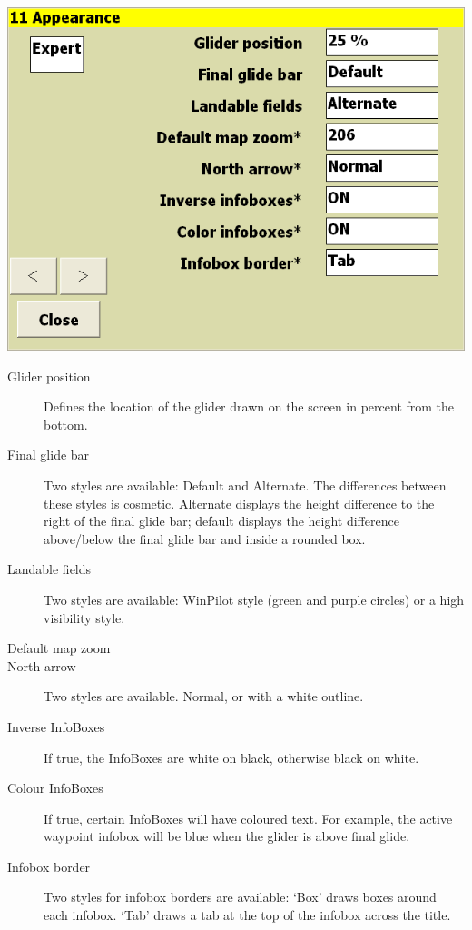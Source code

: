 \documentclass[a4paper,12pt]{refrep}
\begin{document}
\begin{center}
\includegraphics[angle=0,width=\linewidth,keepaspectratio='true']{figures/config-9.png}
\end{center}

\begin{description}
\item[Glider position]  Defines the location of the glider drawn on the screen
in percent from the bottom.
\item[Final glide bar] Two styles are available: Default and Alternate.  The differences between these styles is cosmetic.  Alternate displays the height difference to the right of the final glide bar; default displays the height difference above/below the final glide bar and inside a rounded box.
\item[Landable fields] Two styles are available: WinPilot style (green and
  purple circles) or a high visibility style.
\item[Default map zoom]
\item[North arrow]  Two styles are available.  Normal, or with a white
 outline.
\item[Inverse InfoBoxes]  If true, the InfoBoxes are white on black, otherwise black on white.
\item[Colour InfoBoxes]  If true, certain InfoBoxes will have coloured text.  For example, the active waypoint infobox will be blue when the glider is above final glide.
\item[Infobox border]  Two styles for infobox borders are available:
`Box' draws boxes around each infobox.  `Tab' draws a tab at the top
of the infobox across the title.
\end{description}
\end{document}
